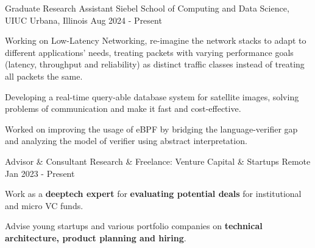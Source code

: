 

\begin{cventries}


  \cventry
    {Graduate Research Assistant} %
    {Siebel School of Computing and Data Science, UIUC} %
    {Urbana, Illinois} %
    {Aug 2024 - Present} %
    {
      \begin{cvitems} %
      \item Working on Low-Latency Networking, re-imagine the network stacks to adapt to different applications' needs, treating packets with varying performance goals (latency, throughput and reliability) as distinct traffic classes instead of treating all packets the same.
      \item Developing a real-time query-able database system for satellite images, solving problems of communication and make it fast and cost-effective.
      \item Worked on improving the usage of eBPF by bridging the language-verifier gap and analyzing the model of verifier using abstract interpretation.
      \end{cvitems}
    }


  \cventry
    {Advisor \& Consultant} %
    {Research \& Freelance: Venture Capital \& Startups} %
    {Remote} %
    {Jan 2023 - Present} %
    {
      \begin{cvitems} %
      \item {Work as a \textbf{deeptech expert} for \textbf{evaluating potential deals} for institutional and micro VC funds.}
      \item {Advise young startups and various portfolio companies on \textbf{technical architecture, product planning and hiring}.}
      \end{cvitems}
    }


\end{cventries}
